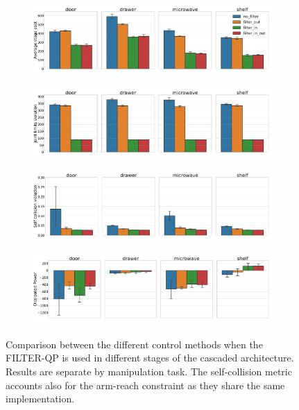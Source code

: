 \begin{figure}[t]
\centering
\hspace*{-0.2cm} 
\begin{subfigure}{1\columnwidth}
    \includegraphics[width=\linewidth]{figures/methods_comparison/average_stage_cost.pdf}
\end{subfigure}%
\hfill
\hspace*{-0.2cm} 
\begin{subfigure}{1\columnwidth}
    \includegraphics[width=\linewidth]{figures/methods_comparison/joint_limits.pdf}
\end{subfigure}%
\hfill
\hspace*{-0.2cm} 
\begin{subfigure}{1\columnwidth}
    \includegraphics[width=\linewidth]{figures/methods_comparison/self_collision.pdf}
\end{subfigure}
\hspace*{-0.2cm} 
\begin{subfigure}{1\columnwidth}
    \includegraphics[width=\linewidth]{figures/methods_comparison/dissipated_power.pdf}
\end{subfigure}
\hfill
\caption{Comparison between the different control methods when the FILTER-QP is used in different stages of the cascaded architecture. Results are separate by manipulation task. The self-collision metric accounts also for the arm-reach constraint as they share the same implementation.}\label{fig:methods_comparison}
\end{figure}

